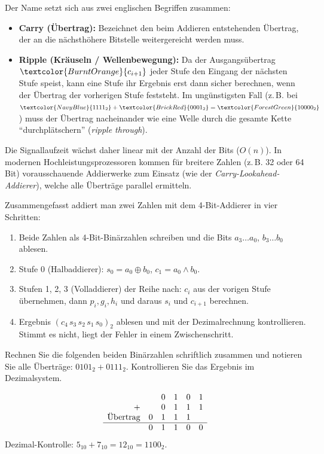 \begin{myremark}
    Der Name setzt sich aus zwei englischen Begriffen zusammen:
    \begin{itemize}
        \item \textbf{Carry (Übertrag):} Bezeichnet den beim Addieren entstehenden Übertrag, der an die nächsthöhere Bitstelle weitergereicht werden muss.
        \item \textbf{Ripple (Kräuseln / Wellenbewegung):} Da der Ausgangsübertrag $\textcolor{BurntOrange}{c_{i+1}}$ jeder Stufe den Eingang der nächsten Stufe speist, kann eine Stufe ihr Ergebnis erst dann sicher berechnen, wenn der Übertrag der vorherigen Stufe feststeht. Im ungünstigsten Fall (z.\,B. bei $\textcolor{NavyBlue}{1111_2} + \textcolor{BrickRed}{0001_2} = \textcolor{ForestGreen}{10000_2}$) muss der Übertrag nacheinander wie eine Welle durch die gesamte Kette \enquote{durchplätschern} (\textit{ripple through}).
    \end{itemize}
    Die Signallaufzeit wächst daher linear mit der Anzahl der Bits ($O(n)$). In modernen Hochleistungsprozessoren kommen für breitere Zahlen (z.\,B. 32 oder 64 Bit) vorausschauende Addierwerke zum Einsatz (wie der \textit{Carry-Lookahead-Addierer}), welche alle Überträge parallel ermitteln.
\end{myremark}

Zusammengefasst addiert man zwei Zahlen mit dem 4-Bit-Addierer in vier Schritten:
\begin{enumerate}
    \item Beide Zahlen als 4-Bit-Binärzahlen schreiben und die Bits $a_3 \ldots a_0$, $b_3 \ldots b_0$ ablesen.
    \item Stufe 0 (Halbaddierer): $s_0 = a_0 \oplus b_0$, $c_1 = a_0 \land b_0$.
    \item Stufen 1, 2, 3 (Volladdierer) der Reihe nach: $c_i$ aus der vorigen Stufe übernehmen, dann $p_i, g_i, h_i$ und daraus $s_i$ und $c_{i+1}$ berechnen.
    \item Ergebnis $(c_4\,s_3\,s_2\,s_1\,s_0)_2$ ablesen und mit der Dezimalrechnung kontrollieren. Stimmt es nicht, liegt der Fehler in einem Zwischenschritt.
\end{enumerate}

\begin{myexercise}\label{myexercise:binaeraddition-einfach}
	Rechnen Sie die folgenden beiden Binärzahlen schriftlich zusammen und notieren Sie alle Überträge: $0101_2 + 0111_2$. Kontrollieren Sie das Ergebnis im Dezimalsystem.
	\begin{myanswer}
		\[
			\begin{array}{rccccc}
				                &   & 0 & 1 & 0 & 1 \\
				+               &   & 0 & 1 & 1 & 1 \\
				\text{Übertrag} & 0 & 1 & 1 & 1 &   \\\hline
				                & 0 & 1 & 1 & 0 & 0
			\end{array}
		\]
		Dezimal-Kontrolle: $5_{10} + 7_{10} = 12_{10} = 1100_2$.
	\end{myanswer}
\end{myexercise}

